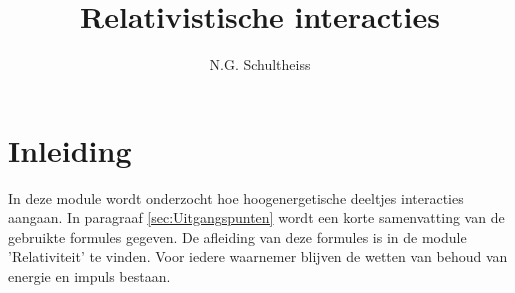 
\usepackage{tikz}
\usepackage{multicol}
\usetikzlibrary{shapes}
\usetikzlibrary{plotmarks}



\title{Relativistische interacties}
\author{N.G. Schultheiss}

\maketitle

\section{Inleiding}

In deze module wordt onderzocht hoe hoogenergetische deeltjes interacties
aangaan. In paragraaf \ref{sec:Uitgangspunten} wordt een korte samenvatting
van de gebruikte formules gegeven. De afleiding van deze formules is in de 
module 'Relativiteit' te vinden. Voor iedere waarnemer blijven de wetten van 
behoud van energie en impuls bestaan.

